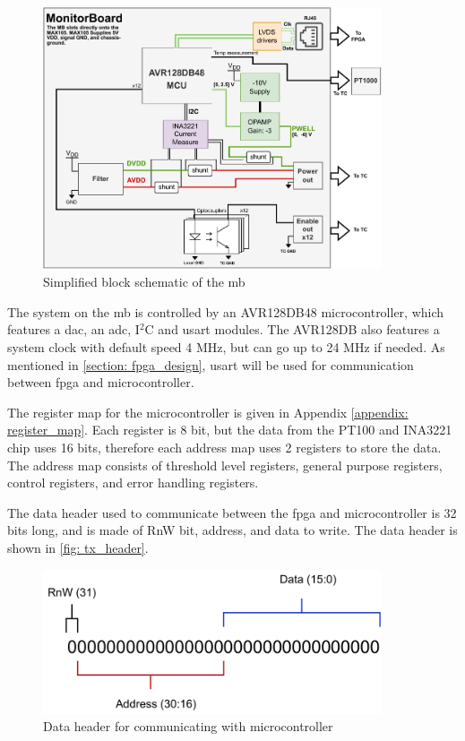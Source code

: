 \documentclass[main.tex]{subfiles}
\begin{document}
\begin{figure}[!htpb]
    \centering
    \includegraphics[width=10cm, scale=1]{images/MonitorBoardBlockSchematic.pdf}
    \caption{Simplified block schematic of the \acrfull{mb}}
    \label{fig: mb_schematic}
\end{figure}
\FloatBarrier

The system on the \gls{mb} is controlled by an AVR128DB48 microcontroller, which features a \gls{dac}, an \gls{adc}, I$^2$C and \gls{usart} modules. The AVR128DB also features a  system clock with default speed 4 MHz, but can go up to 24 MHz if needed. As mentioned in \autoref{section: fpga_design}, \acrshort{usart} will be used for communication between \gls{fpga} and microcontroller.

The register map for the microcontroller is given in Appendix \ref{appendix: register_map}. Each register is 8 bit, but the data from the PT100 and INA3221 chip uses 16 bits, therefore each address map uses 2 registers to store the data. The address map consists of threshold level registers, general purpose registers, control registers, and error handling registers.

The data header used to communicate between the \gls{fpga} and microcontroller is 32 bits long, and is made of RnW bit, address, and data to write. The data header is shown in \autoref{fig: tx_header}.

\begin{figure}[!htpb]
    \centering
    \includegraphics[width=10cm, scale=1]{images/TX packet header.pdf}
    \caption{Data header for communicating with microcontroller}
    \label{fig: tx_header}
\end{figure}
\FloatBarrier
\end{document}
